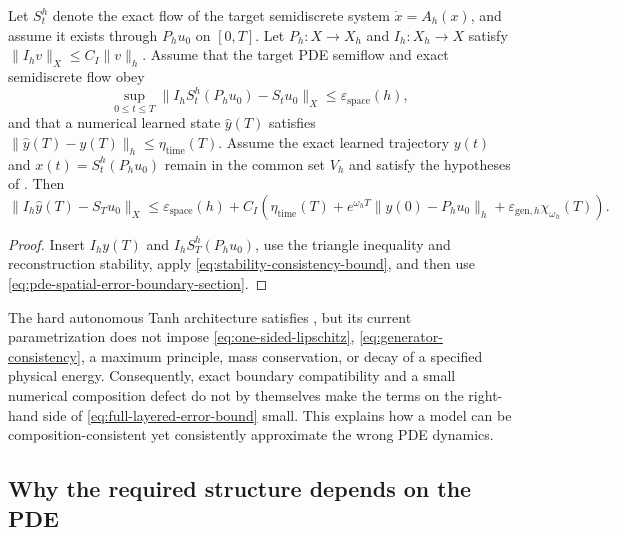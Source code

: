 \begin{corollary}\label{cor:layered-pde-rollout}
Let $S_t^h$ denote the exact flow of the target semidiscrete system $\dot x=A_h(x)$, and assume it exists through $P_hu_0$ on $[0,T]$.  Let $P_h:X\to X_h$ and $I_h:X_h\to X$ satisfy $\lVert I_hv\rVert_X\leq C_I\lVert v\rVert_h$.  Assume that the target PDE semiflow and exact semidiscrete flow obey
\begin{equation}\label{eq:pde-spatial-error-boundary-section}
\sup_{0\leq t\leq T}\lVert I_hS_t^h(P_hu_0)-S_tu_0\rVert_X\leq\varepsilon_{\mathrm{space}}(h),
\end{equation}
and that a numerical learned state $\widehat y(T)$ satisfies $\lVert\widehat y(T)-y(T)\rVert_h\leq\eta_{\mathrm{time}}(T)$.  Assume the exact learned trajectory $y(t)$ and $x(t)=S_t^h(P_hu_0)$ remain in the common set $V_h$ and satisfy the hypotheses of .  Then
\begin{equation}\label{eq:full-layered-error-bound}
\lVert I_h\widehat y(T)-S_Tu_0\rVert_X\leq\varepsilon_{\mathrm{space}}(h)+C_I\left(\eta_{\mathrm{time}}(T)+e^{\omega_hT}\lVert y(0)-P_hu_0\rVert_h+\varepsilon_{\mathrm{gen},h}\chi_{\omega_h}(T)\right).
\end{equation}
\end{corollary}

\begin{proof}
Insert $I_hy(T)$ and $I_hS_T^h(P_hu_0)$, use the triangle inequality and reconstruction stability, apply \eqref{eq:stability-consistency-bound}, and then use \eqref{eq:pde-spatial-error-boundary-section}.
\end{proof}

\begin{remark}\label{rem:boundary-current-missing-stability}
The hard autonomous Tanh architecture satisfies , but its current parametrization does not impose \eqref{eq:one-sided-lipschitz}, \eqref{eq:generator-consistency}, a maximum principle, mass conservation, or decay of a specified physical energy.  Consequently, exact boundary compatibility and a small numerical composition defect do not by themselves make the terms on the right-hand side of \eqref{eq:full-layered-error-bound} small.  This explains how a model can be composition-consistent yet consistently approximate the wrong PDE dynamics.
\end{remark}

\subsection{Why the required structure depends on the PDE}

